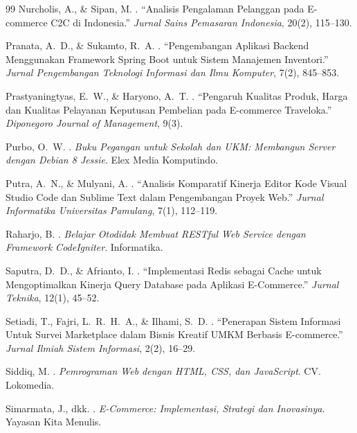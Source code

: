 \documentclass[12pt,a4paper,twocolumn]{article}
\begin{document}
\begin{thebibliography}{99}
Nurcholis, A., \& Sipan, M.
.
\newblock ``Analisis Pengalaman Pelanggan pada E-commerce C2C di Indonesia.''
\newblock \emph{Jurnal Sains Pemasaran Indonesia}, 20(2), 115--130.

Pranata, A.~D., \& Sukamto, R.~A.
.
\newblock ``Pengembangan Aplikasi Backend Menggunakan Framework Spring Boot untuk Sistem Manajemen Inventori.''
\newblock \emph{Jurnal Pengembangan Teknologi Informasi dan Ilmu Komputer}, 7(2), 845--853.

Prastyaningtyas, E.~W., \& Haryono, A.~T.
.
\newblock ``Pengaruh Kualitas Produk, Harga dan Kualitas Pelayanan Keputusan Pembelian pada E-commerce Traveloka.''
\newblock \emph{Diponegoro Journal of Management}, 9(3).

Purbo, O.~W.
.
\newblock \emph{Buku Pegangan untuk Sekolah dan UKM: Membangun Server dengan Debian 8 Jessie}.
\newblock Elex Media Komputindo.

Putra, A.~N., \& Mulyani, A.
.
\newblock ``Analisis Komparatif Kinerja Editor Kode Visual Studio Code dan Sublime Text dalam Pengembangan Proyek Web.''
\newblock \emph{Jurnal Informatika Universitas Pamulang}, 7(1), 112--119.

Raharjo, B.
.
\newblock \emph{Belajar Otodidak Membuat RESTful Web Service dengan Framework CodeIgniter}.
\newblock Informatika.

Saputra, D.~D., \& Afrianto, I.
.
\newblock ``Implementasi Redis sebagai Cache untuk Mengoptimalkan Kinerja Query Database pada Aplikasi E-Commerce.''
\newblock \emph{Jurnal Teknika}, 12(1), 45--52.

Setiadi, T., Fajri, L.~R.~H.~A., \& Ilhami, S.~D.
.
\newblock ``Penerapan Sistem Informasi Untuk Survei Marketplace dalam Bisnis Kreatif UMKM Berbasis E-commerce.''
\newblock \emph{Jurnal Ilmiah Sistem Informasi}, 2(2), 16--29.

Siddiq, M.
.
\newblock \emph{Pemrograman Web dengan HTML, CSS, dan JavaScript}.
\newblock CV. Lokomedia.

Simarmata, J., dkk.
.
\newblock \emph{E-Commerce: Implementasi, Strategi dan Inovasinya}.
\newblock Yayasan Kita Menulis.


\end{thebibliography}
\end{document}
